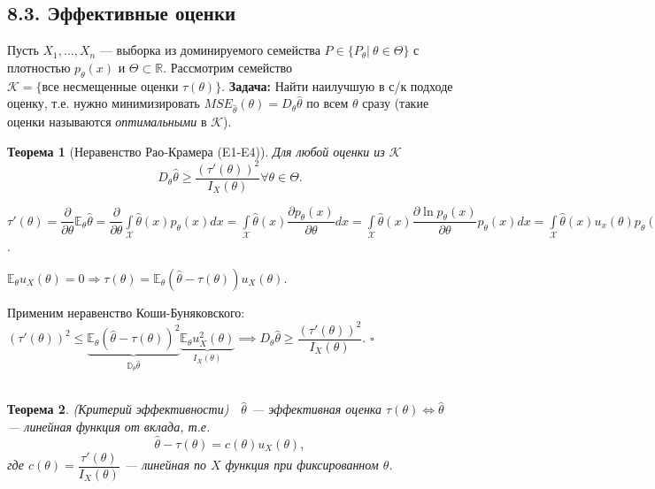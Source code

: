 \documentclass[12pt]{report}
\renewenvironment{proof}{{\bfseries Доказательство:}}{$\square$\\\\}
\newtheorem{theorem}{Теорема}
\theoremstyle{definition}
\begin{document}
\subsection{8.3. Эффективные оценки}
Пусть $X_1, \dots, X_n$ --- выборка из доминируемого семейства $P \in \{P_\theta | \ \theta \in \Theta \}$ с плотностью $p_\theta(x)$ и $\Theta \subset \mathbb{R}$.
Рассмотрим семейство $\mathcal{K} = \{\text{все несмещенные оценки }\tau(\theta)\}$.
\textbf{Задача:} Найти наилучшую в с/к подходе оценку, т.е. нужно минимизировать $MSE_{\hat{\theta}}(\theta) = D_\theta \hat{\theta}$ по всем $\theta$ сразу 
(такие оценки называются \emph{оптимальными} в $\mathcal{K}$).
\begin{theorem}[Неравенство Рао-Крамера (E1-E4)]
	Для любой оценки из $\mathcal{K}$
	$$ D_\theta \hat{\theta} \geqslant \dfrac{(\tau'(\theta))^2}{I_X(\theta)} \forall \theta \in \Theta. $$
\end{theorem}
\begin{proof}
	$\tau'(\theta) = \dfrac{\partial}{\partial\theta} \mathbb{E}_\theta \hat{\theta} = \dfrac{\partial}{\partial\theta} \displaystyle{\int\limits_{\mathscr{X}}} \hat{\theta}(x)p_\theta(x)dx = \int\limits_{\mathscr{X}} \hat{\theta}(x)\dfrac{\partial p_\theta(x)}{\partial\theta}dx = \int\limits_{\mathscr{X}} \hat{\theta}(x)\dfrac{\partial \ln p_\theta(x)}{\partial\theta}p_\theta(x) dx = \int\limits_{\mathscr{X}} \hat{\theta}(x)u_x(\theta)p_\theta(x)dx = \mathbb{E}_\theta\hat{\theta}u_X(\theta)$.
	
	$\mathbb{E}_\theta u_X(\theta) = 0 \Rightarrow \tau(\theta) = \mathbb{E}_\theta (\hat{\theta} - \tau(\theta))u_X(\theta)$.
	
	Применим неравенство Коши-Буняковского:
	$(\tau'(\theta))^2 \leqslant \underbrace{\mathbb{E}_\theta(\hat{\theta} - \tau(\theta))^2}_{\mathbb{D}_\theta \hat{\theta}} \underbrace{\mathbb{E}_\theta u_X^2(\theta)}_{I_X(\theta)} \implies D_\theta \hat{\theta} \geqslant \dfrac{(\tau'(\theta))^2}{I_X(\theta)}.$
\end{proof}
\begin{theorem}(Критерий эффективности)
	$\;$
	$\hat{\theta}$ --- эффективная оценка $\tau(\theta) \iff \hat{\theta}$ --- линейная функция от вклада, т.е.
	$$\hat{\theta} - \tau(\theta) = c(\theta)u_X(\theta), $$
	где $c(\theta) = \dfrac{\tau'(\theta)}{I_X(\theta)}$ --- линейная по $X$ функция при фиксированном $\theta$.
\end{theorem}
\end{document}
